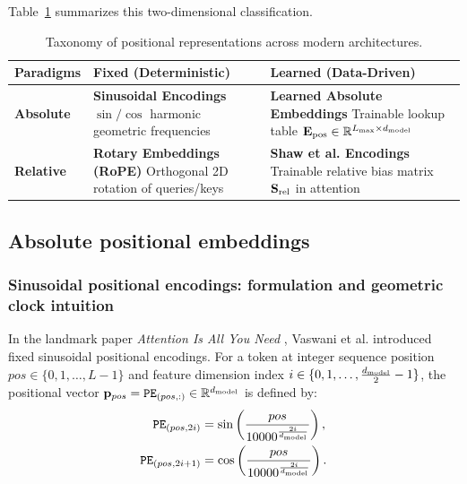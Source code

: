 \documentclass[../../main.tex]{subfiles}
\begin{document}
Table~\ref{tab:pe_taxonomy_matrix} summarizes this two-dimensional classification.

\begin{table}[htbp]
\centering
\small
\caption{Taxonomy of positional representations across modern architectures.}
\label{tab:pe_taxonomy_matrix}
\begin{tabularx}{\textwidth}{lXX}
\toprule
\textbf{Paradigms} & \textbf{Fixed (Deterministic)} & \textbf{Learned (Data-Driven)} \\
\midrule
\textbf{Absolute} & \textbf{Sinusoidal Encodings} \cite{vaswani2017} \newline $\sin/\cos$ harmonic geometric frequencies & \textbf{Learned Absolute Embeddings} \cite{radford2019, devlin2019} \newline Trainable lookup table $\mathbf{E}_{\text{pos}} \in \mathbb{R}^{L_{\max} \times d_{\text{model}}}$ \\
\midrule
\textbf{Relative} & \textbf{Rotary Embeddings (RoPE)} \cite{su2024roformer} \newline Orthogonal 2D rotation of queries/keys & \textbf{Shaw et al. Encodings} \cite{shaw2018} \newline Trainable relative bias matrix $\mathbf{S}_{\text{rel}}$ in attention \\
\bottomrule
\end{tabularx}
\end{table}

\subsection{Absolute positional embeddings}
\label{subsec:absolute_pe}

\subsubsection{Sinusoidal positional encodings: formulation and geometric clock intuition}
In the landmark paper \emph{Attention Is All You Need} \cite{vaswani2017}, Vaswani et al. introduced fixed sinusoidal positional encodings. For a token at integer sequence position $pos \in \{0, 1, \dots, L-1\}$ and feature dimension index $i \in \{0, 1, \dots, \frac{d_{\text{model}}}{2}-1\}$, the positional vector $\mathbf{p}_{pos} = \text{\texttt{PE}}_{(pos, :)} \in \mathbb{R}^{d_{\text{model}}}$ is defined by:
\begin{align}
\label{eq:sinusoidal_pe_even_ch5}
\text{\texttt{PE}}_{(pos, 2i)} &= \sin\left(\frac{pos}{10000^{\frac{2i}{d_{\text{model}}}}}\right), \\
\label{eq:sinusoidal_pe_odd_ch5}
\text{\texttt{PE}}_{(pos, 2i+1)} &= \cos\left(\frac{pos}{10000^{\frac{2i}{d_{\text{model}}}}}\right).
\end{align}
\end{document}
